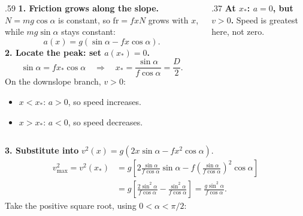 \begin{solutionframe}
  \begin{columns}[T,onlytextwidth]
    \begin{column}{.59\textwidth}
      \textbf{1. Friction grows along the slope.}
      \(N=mg\cos\alpha\) is constant, so \(\mathrm{fr}=fxN\) grows
      with \(x\), while \(mg\sin\alpha\) stays constant:
      \[
        a(x)=g(\sin\alpha-fx\cos\alpha).
      \]
      \textbf{2. Locate the peak: set \(a(x_*)=0\).}
      \[
        \sin\alpha=fx_*\cos\alpha
        \quad\Rightarrow\quad
        x_*=\frac{\sin\alpha}{f\cos\alpha}=\frac D2.
      \]
      On the downslope branch, \(v>0\):
      \begin{itemize}
        \item \(x<x_*\): \(a>0\), so speed increases.
        \item \(x>x_*\): \(a<0\), so speed decreases.
      \end{itemize}
    \end{column}
    \begin{column}{.37\textwidth}
      \medskip
      \textbf{At \(x_*\): \(a=0\), but \(v>0\).}
      Speed is greatest here, not zero.
    \end{column}
  \end{columns}
\end{solutionframe}

\begin{solutionframe}
  \par
  \textbf{3. Substitute into} \(v^2(x)=g(2x\sin\alpha-fx^2\cos\alpha)\).
  \[
    \begin{aligned}
      v_{\max}^2=v^2(x_*)
        &=g\left[2\frac{\sin\alpha}{f\cos\alpha}\sin\alpha
          -f\left(\frac{\sin\alpha}{f\cos\alpha}\right)^2\cos\alpha\right]\\[.4em]
        &=g\left[\frac{2\sin^2\alpha}{f\cos\alpha}
          -\frac{\sin^2\alpha}{f\cos\alpha}\right]
          =\frac{g\sin^2\alpha}{f\cos\alpha}.
    \end{aligned}
  \]
  Take the positive square root, using \(0<\alpha<\pi/2\):
\end{solutionframe}

